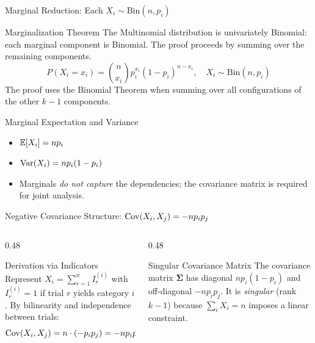 \documentclass[aspectratio=169,xcolor={dvipsnames,table}]{beamer}
\begin{document}
\begin{frame}{Marginal Reduction: Each $X_{i} \sim \text{Bin}(n, p_{i})$}
	\vspace{-0.15cm}
	\begin{block}{Marginalization Theorem}
		\footnotesize
		The Multinomial distribution is univariately Binomial: each marginal component is Binomial. The proof proceeds by summing over the remaining components.
		$$P(X_{i} = x_{i}) = \binom{n}{x_{i}} p_{i}^{x_{i}} (1 - p_{i})^{n - x_{i}}, \quad X_{i} \sim \text{Bin}(n, p_{i})$$
		The proof uses the Binomial Theorem when summing over all configurations of the other $k-1$ components.
	\end{block}
	\vspace{-0.1cm}
	\pause
	\begin{alertblock}{Marginal Expectation and Variance}
		\footnotesize
		\begin{itemize}\itemsep=0.03cm
			\item $\mathbb{E}[X_{i}] = n p_{i}$
			\item $\operatorname{Var}(X_{i}) = n p_{i} (1 - p_{i})$
			\item Marginals \emph{do not capture} the dependencies; the covariance matrix is required for joint analysis.
		\end{itemize}
	\end{alertblock}
\end{frame}

\begin{frame}{Negative Covariance Structure: $\operatorname{Cov}(X_{i}, X_{j}) = -n p_{i} p_{j}$}
	\vspace{-0.15cm}
	\begin{columns}[T]
		\begin{column}{0.48\textwidth}
			\begin{block}{Derivation via Indicators}
				\footnotesize
				Represent $X_{i} = \sum_{r=1}^{n} I_{r}^{(i)}$ with $I_{r}^{(i)} = 1$ if trial $r$ yields category $i$. By bilinearity and independence between trials:
				$$\operatorname{Cov}(X_{i}, X_{j}) = n \cdot (-p_{i} p_{j}) = -n p_{i} p_{j}$$
			\end{block}
		\end{column}
		\begin{column}{0.48\textwidth}
			\begin{alertblock}{Singular Covariance Matrix}
				\footnotesize
				The covariance matrix $\bm{\Sigma}$ has diagonal $np_{i}(1-p_{i})$ and off-diagonal $-np_{i}p_{j}$. It is \emph{singular} (rank $k-1$) because $\sum_{i} X_{i} = n$ imposes a linear constraint.
			\end{alertblock}
		\end{column}
	\end{columns}
\end{frame}
\end{document}
